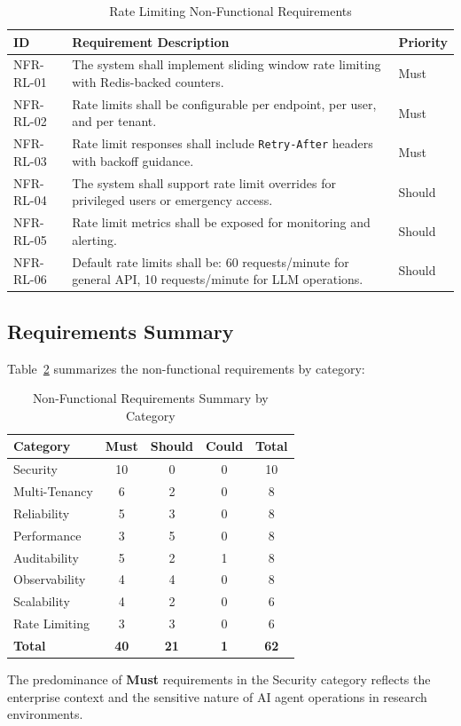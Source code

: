 \begin{table}[htbp]
\centering
\caption{Rate Limiting Non-Functional Requirements}
\label{tab:nfr-ratelimit}
\small
\begin{tabularx}{\textwidth}{|l|X|l|}
\hline
\textbf{ID} & \textbf{Requirement Description} & \textbf{Priority} \\
\hline
NFR-RL-01 & The system shall implement sliding window rate limiting with Redis-backed counters. & Must \\
\hline
NFR-RL-02 & Rate limits shall be configurable per endpoint, per user, and per tenant. & Must \\
\hline
NFR-RL-03 & Rate limit responses shall include \texttt{Retry-After} headers with backoff guidance. & Must \\
\hline
NFR-RL-04 & The system shall support rate limit overrides for privileged users or emergency access. & Should \\
\hline
NFR-RL-05 & Rate limit metrics shall be exposed for monitoring and alerting. & Should \\
\hline
NFR-RL-06 & Default rate limits shall be: 60 requests/minute for general API, 10 requests/minute for LLM operations. & Should \\
\hline
\end{tabularx}
\end{table}

\subsection{Requirements Summary}
\label{subsec:nfr-summary}

Table~\ref{tab:nfr-summary} summarizes the non-functional requirements by category:

\begin{table}[htbp]
\centering
\caption{Non-Functional Requirements Summary by Category}
\label{tab:nfr-summary}
\begin{tabular}{|l|c|c|c|c|}
\hline
\textbf{Category} & \textbf{Must} & \textbf{Should} & \textbf{Could} & \textbf{Total} \\
\hline
Security & 10 & 0 & 0 & 10 \\
Multi-Tenancy & 6 & 2 & 0 & 8 \\
Reliability & 5 & 3 & 0 & 8 \\
Performance & 3 & 5 & 0 & 8 \\
Auditability & 5 & 2 & 1 & 8 \\
Observability & 4 & 4 & 0 & 8 \\
Scalability & 4 & 2 & 0 & 6 \\
Rate Limiting & 3 & 3 & 0 & 6 \\
\hline
\textbf{Total} & \textbf{40} & \textbf{21} & \textbf{1} & \textbf{62} \\
\hline
\end{tabular}
\end{table}

The predominance of \textbf{Must} requirements in the Security category reflects the enterprise context and the sensitive nature of AI agent operations in research environments.
